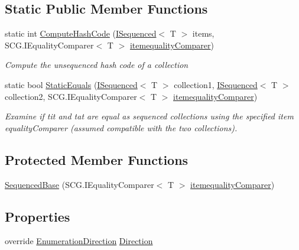 \subsection*{Static Public Member Functions}
\begin{DoxyCompactItemize}
\item 
static int \hyperlink{class_c5_1_1_sequenced_base_a7a06a8dab6a5973f1b2f5ead658ed190}{Compute\+Hash\+Code} (\hyperlink{interface_c5_1_1_i_sequenced}{I\+Sequenced}$<$ T $>$ items, S\+C\+G.\+I\+Equality\+Comparer$<$ T $>$ \hyperlink{class_c5_1_1_collection_base_a95e343400be0e8f3f8d6310f1aaf2cc6}{itemequality\+Comparer})
\begin{DoxyCompactList}\small\item\em Compute the unsequenced hash code of a collection \end{DoxyCompactList}\item 
static bool \hyperlink{class_c5_1_1_sequenced_base_a86ecb6bbc6577bf8020880eb5b3fc315}{Static\+Equals} (\hyperlink{interface_c5_1_1_i_sequenced}{I\+Sequenced}$<$ T $>$ collection1, \hyperlink{interface_c5_1_1_i_sequenced}{I\+Sequenced}$<$ T $>$ collection2, S\+C\+G.\+I\+Equality\+Comparer$<$ T $>$ \hyperlink{class_c5_1_1_collection_base_a95e343400be0e8f3f8d6310f1aaf2cc6}{itemequality\+Comparer})
\begin{DoxyCompactList}\small\item\em Examine if tit and tat are equal as sequenced collections using the specified item equality\+Comparer (assumed compatible with the two collections). \end{DoxyCompactList}\end{DoxyCompactItemize}
\subsection*{Protected Member Functions}
\begin{DoxyCompactItemize}
\item 
\hyperlink{class_c5_1_1_sequenced_base_a2f8bcbb35e0d5bbcbf7a373976883131}{Sequenced\+Base} (S\+C\+G.\+I\+Equality\+Comparer$<$ T $>$ \hyperlink{class_c5_1_1_collection_base_a95e343400be0e8f3f8d6310f1aaf2cc6}{itemequality\+Comparer})
\end{DoxyCompactItemize}
\subsection*{Properties}
\begin{DoxyCompactItemize}
\item 
override \hyperlink{namespace_c5_aad282676794e49130eb8caed289395f8}{Enumeration\+Direction} \hyperlink{class_c5_1_1_sequenced_base_a19791239674d780d5ae0e19a5f83d616}{Direction}
\end{DoxyCompactItemize}
